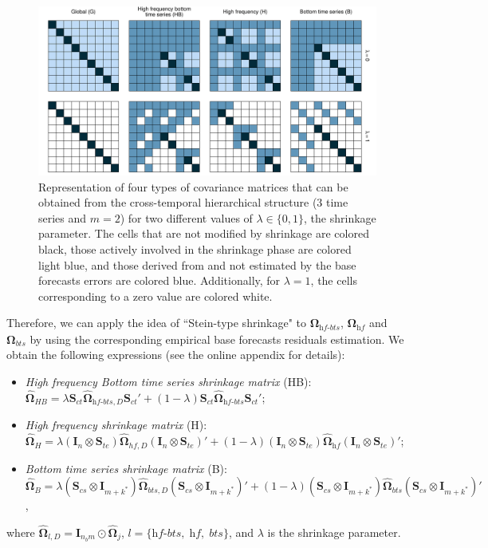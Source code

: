 \documentclass[12pt]{article}
\newcommand{\Ivet}{\bm{I}}
\newcommand{\Svet}{\bm{S}}
\newcommand{\Omegavet}{\bm{\Omega}}
\theoremstyle{definition}
\begin{document}
\begin{figure}[!b]
	\centering
	\includegraphics[width = \linewidth]{fig/shr_cov/shr_color.pdf}
	\caption{Representation of four types of covariance matrices that can be obtained from the cross-temporal hierarchical structure ($3$ time series and $m = 2$) for two different values of $\lambda\in\{0,1\}$, the shrinkage parameter. The cells that are not modified by shrinkage are colored black, those actively involved in the shrinkage phase are colored light blue, and those derived from and not estimated by the base forecasts errors are colored blue. Additionally, for $\lambda = 1$, the cells corresponding to a zero value are colored white.}
	\label{fig:shr_grid}
\end{figure}

Therefore, we can apply the idea of “Stein-type shrinkage" \citep{efron1977} to $\Omegavet_{\textit{hf-bts}}$, $\Omegavet_{\textit{hf}}$ and $\Omegavet_{\textit{bts}}$ by using the corresponding empirical base forecasts residuals estimation. We obtain the following expressions (see the online appendix for details):
\begin{itemize}[nosep]
	\item \textit{High frequency Bottom time series shrinkage matrix} (HB): \\ 
	$\widehat{\Omegavet}_{HB} = \lambda \Svet_{ct}\widehat{\Omegavet}_{\textit{hf-bts}, D}\Svet_{ct}'+ (1-\lambda) \Svet_{ct}\widehat{\Omegavet}_{\textit{hf-bts}}\Svet_{ct}'$;
	\item \textit{High frequency shrinkage matrix} (H): \\ $\widehat{\Omegavet}_{H}  = \lambda (\Ivet_{n} \otimes \Svet_{te})\widehat{\Omegavet}_{hf, D}(\Ivet_{n} \otimes \Svet_{te})' + (1-\lambda) (\Ivet_{n} \otimes \Svet_{te})\widehat{\Omegavet}_{\textit{hf}}(\Ivet_{n} \otimes \Svet_{te})'$;
	\item \textit{Bottom time series shrinkage matrix} (B): \\$\widehat{\Omegavet}_{B} = \lambda \left(\Svet_{cs} \otimes \Ivet_{m+k^\ast}\right)\widehat{\Omegavet}_{bts, D}\left(\Svet_{cs} \otimes \Ivet_{m+k^\ast}\right)' +  (1-\lambda) \left(\Svet_{cs} \otimes \Ivet_{m+k^\ast}\right)\widehat{\Omegavet}_{bts}\left(\Svet_{cs} \otimes \Ivet_{m+k^\ast}\right)'$,
\end{itemize}
where $\widehat{\Omegavet}_{l, D} = \Ivet_{n_b m}\odot\widehat{\Omegavet}_{j}$, $l = \{\textit{hf-bts}, \;\textit{hf}, \;\textit{bts}\}$, and $\lambda$ is the shrinkage parameter.
\end{document}
